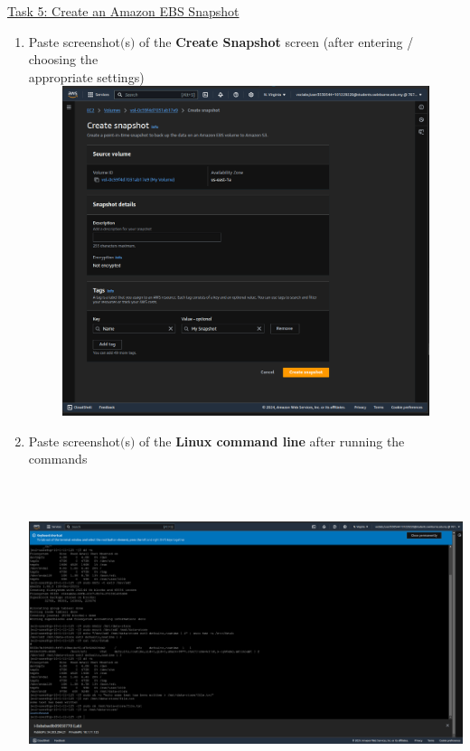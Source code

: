 \documentclass[11pt]{article}
\begin{document}
\newpage

\noindent\underline{Task 5: Create an Amazon EBS Snapshot}
\begin{enumerate}[resume]
    \item Paste screenshot$($s$)$ of the \textbf{Create Snapshot} screen (after entering / choosing the \\ appropriate settings) \\
     


    {\centering
    \includegraphics[width=6.1in, height=3.8in]{pics/7.png}
    }

    \vspace{5mm}

    \item Paste screenshot$($s$)$ of the \textbf{Linux command line} after running the commands \\
    

    {\centering
    \includegraphics[width=6.1in, height=3.8in]{pics/8.png}
    }


\end{enumerate}
\end{document}
